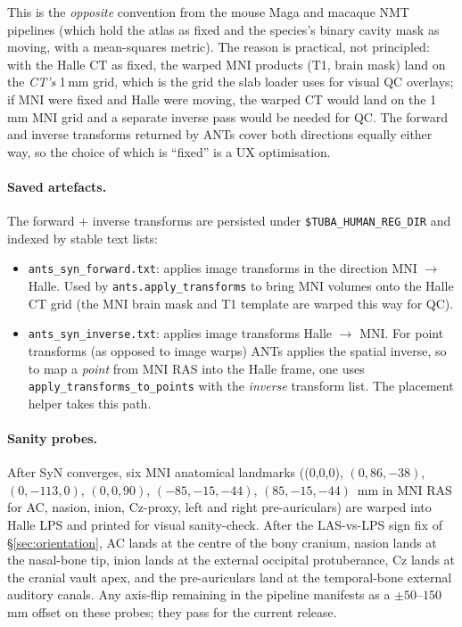 \documentclass{compactarticle}
\begin{document}
This is the {\em opposite} convention from the mouse Maga and macaque
NMT pipelines (which hold the atlas as fixed and the species's binary
cavity mask as moving, with a mean-squares metric). The reason is
practical, not principled: with the Halle CT as fixed, the warped MNI
products (T1, brain mask) land on the {\em CT's} 1\,mm grid, which is
the grid the slab loader uses for visual QC overlays; if MNI were
fixed and Halle were moving, the warped CT would land on the 1\,mm MNI
grid and a separate inverse pass would be needed for QC. The forward
and inverse transforms returned by ANTs cover both directions equally
either way, so the choice of which is ``fixed'' is a UX optimisation.

\paragraph{Saved artefacts.}
The forward + inverse transforms are persisted under
\texttt{\$TUBA\_HUMAN\_REG\_DIR} and indexed by stable text
lists:

\begin{itemize}
\item \texttt{ants\_syn\_forward.txt}: applies image transforms in the
  direction MNI $\rightarrow$ Halle. Used by
  \texttt{ants.apply\_transforms} to bring MNI volumes onto the Halle
  CT grid (the MNI brain mask and T1 template are warped this way for
  QC).
\item \texttt{ants\_syn\_inverse.txt}: applies image transforms
  Halle $\rightarrow$ MNI. For point transforms (as opposed to image
  warps) ANTs applies the spatial inverse, so to map a {\em point} from
  MNI RAS into the Halle frame, one uses
  \texttt{apply\_transforms\_to\_points} with the {\em inverse}
  transform list. The placement helper takes this path.
\end{itemize}

\paragraph{Sanity probes.}
After SyN converges, six MNI anatomical landmarks
\big((0,0,0), $(0,86,-38)$, $(0,-113,0)$, $(0,0,90)$,
$(-85,-15,-44)$, $(85,-15,-44)$~mm in MNI RAS for AC, nasion, inion,
$\mathrm{Cz}$-proxy, left and right pre-auriculars\big) are warped into
Halle LPS and printed for visual sanity-check. After the
LAS-vs-LPS sign fix of \S\ref{sec:orientation}, AC lands at the centre
of the bony cranium, nasion lands at the nasal-bone tip, inion lands at
the external occipital protuberance, $\mathrm{Cz}$ lands at the cranial
vault apex, and the pre-auriculars land at the temporal-bone external
auditory canals. Any axis-flip remaining in the pipeline manifests as
a $\pm 50$--$150$\,mm offset on these probes; they pass for the current
release.
\end{document}
